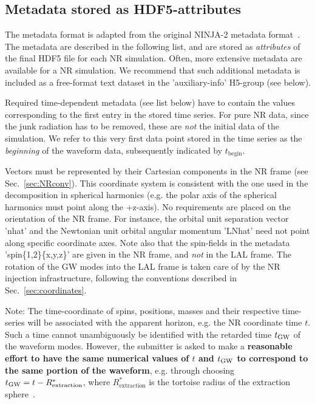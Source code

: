 \documentclass[11pt,tightenlines,article,amssymb,amsmath,amsfonts,superscriptaddress,nofootinbib]{revtex4}
\newcommand{\red}{\textcolor{red}}
\newcommand{\tGW}{t_{\rm GW}}
\begin{document}

\subsection{Metadata stored as HDF5-attributes}
\label{sec:meta}
The metadata format is adapted from the original NINJA-2 metadata format~\cite{Brown:2007jx}. The metadata are described in the following list, and are stored as \emph{attributes} of the final HDF5 file for each NR simulation. Often, more extensive metadata are available for a NR simulation. We recommend that such additional metadata is included as a free-format text dataset in the 'auxiliary-info' H5-group (see below). 

Required time-dependent metadata (see list below) have to contain the values corresponding to the first entry in the stored time series. For pure NR data, since the junk radiation has to be removed, these are \emph{not} the initial data of the simulation. We refer to this very first data point stored in the time series as the \emph{beginning} of the waveform data, subsequently indicated by $t_\mathrm{begin}$. 

Vectors must be represented by their Cartesian components in the NR frame (see Sec.~\ref{sec:NRconv}). This coordinate system is consistent with the one used in the decomposition in spherical harmonics (e.g. the polar axis of the spherical harmonics must point along the +z-axis). No requirements are placed on the orientation of the NR frame. For instance, the orbital unit separation vector 'nhat' and the Newtonian unit orbital angular momentum 'LNhat' need not point along specific coordinate axes. Note also that the spin-fields in the metadata 'spin\{1,2\}\{x,y,z\}' are given in the NR frame, and \emph{not} in the LAL frame. The rotation of the GW modes into the LAL frame is taken care of by the NR injection infrastructure, following the conventions described in Sec.~\ref{sec:coordinates}. 

Note: The time-coordinate of spins, positions, masses and their
respective time-series will be associated with the apparent horizon,
e.g. the NR coordinate time $t$. Such a time cannot
unambiguously be identified with the retarded time $\tGW$ of the
waveform modes.
\label{tGW-vs-tNR}
However, the submitter is asked to make a {\bf reasonable
effort to have the same numerical values of $t$ and $\tGW$
to correspond to the same portion of the waveform}, e.g. through
choosing $\tGW = t - R^*_\mathrm{extraction}$, where
$R^*_\mathrm{extraction}$ is the tortoise radius of the extraction sphere~\cite{Fiske:2005fx,Boyle:2009vi}. \\
\newline
\end{document}

